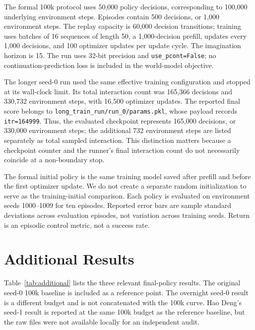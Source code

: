 \documentclass{article}
\begin{document}
The formal 100k protocol uses 50,000 policy decisions, corresponding to 100,000 underlying environment steps. Episodes contain 500 decisions, or 1,000 environment steps. The replay capacity is 60,000 decision transitions; training uses batches of 16 sequences of length 50, a 1,000-decision prefill, updates every 1,000 decisions, and 100 optimizer updates per update cycle. The imagination horizon is 15. The run uses 32-bit precision and \texttt{use\_pcont=False}; no continuation-prediction loss is included in the world-model objective.

The longer seed-0 run used the same effective training configuration and stopped at its wall-clock limit. Its total interaction count was 165,366 decisions and 330,732 environment steps, with 16,500 optimizer updates. The reported final score belongs to \texttt{long\_train\_run/run\_0/params.pkl}, whose payload records \texttt{itr=164999}. Thus, the evaluated checkpoint represents 165,000 decisions, or 330,000 environment steps; the additional 732 environment steps are listed separately as total sampled interaction. This distinction matters because a checkpoint counter and the runner's final interaction count do not necessarily coincide at a non-boundary stop.

The formal initial policy is the same training model saved after prefill and before the first optimizer update. We do not create a separate random initialization to serve as the training-initial comparison. Each policy is evaluated on environment seeds 1000--1009 for ten episodes. Reported error bars are sample standard deviations across evaluation episodes, not variation across training seeds. Return is an episodic control metric, not a success rate.

\section{Additional Results}

Table~\ref{tab:additional} lists the three relevant final-policy results. The original seed-0 100k baseline is included as a reference point. The overnight seed-0 result is a different budget and is not concatenated with the 100k curve. Hao Deng's seed-1 result is reported at the same 100k budget as the reference baseline, but the raw files were not available locally for an independent audit.
\end{document}
